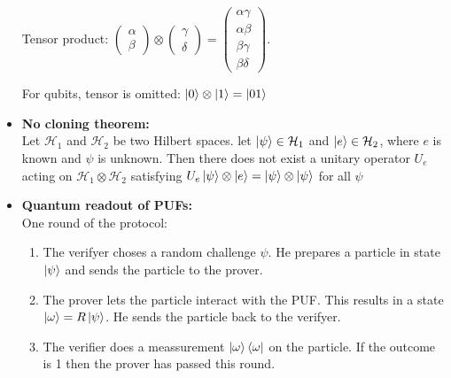 \documentclass[twocolumn,9pt]{extarticle}
\begin{document}
\begin{itemize}
	Tensor product:
	$\begin{pmatrix}\alpha \\ \beta\end{pmatrix} \otimes \begin{pmatrix}\gamma \\ \delta\end{pmatrix} = \begin{pmatrix}\alpha\gamma \\ \alpha\beta \\ \beta\gamma \\ \beta\delta\end{pmatrix}$.

	For qubits, tensor is omitted: $\ket{0} \otimes \ket{1} = \ket{01}$

	\item \textbf{No cloning theorem: } \\
	Let $\mathcal{H}_1$ and $\mathcal{H}_2$ be two Hilbert spaces. let $\ket{\psi} \in \mathcal{H}_1$ and $\ket{e} \in \mathcal{H}_2$, where $e$ is known and $\psi$ is unknown. Then there does not exist a unitary operator $U_e$ acting on $\mathcal{H}_1 \otimes \mathcal{H}_2$ satisfying $U_e\ket{\psi} \otimes \ket{e} = \ket{\psi} \otimes \ket{\psi}$ for all $\psi$


	\item \textbf{Quantum readout of PUFs:} \\
	One round of the protocol:
	\begin{enumerate}
		\item The verifyer choses a random challenge $\psi$. He prepares a particle in state $\ket{\psi}$ and sends the particle to the prover.
		\item The prover lets the particle interact with the PUF. This results in a state $\ket{\omega} =  R\ket{\psi}$. He sends the particle back to the verifyer.
		\item The verifier does a meassurement $\ket{\omega}\bra{\omega}$ on the particle. If the outcome is 1 then the prover has passed this round.
	\end{enumerate}

\end{itemize}
\end{document}
